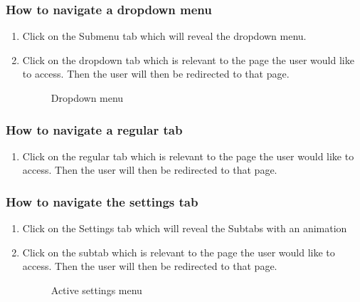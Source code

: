 \documentclass[14pt, a4paper]{article}
\begin{document}
	\subsubsection{How to navigate a dropdown menu}
		\begin{enumerate}
			\item Click on the Submenu tab which will reveal the dropdown menu.
			\item Click on the dropdown tab which is relevant to the page the user would like to access. Then the user will then be redirected to that page.
			\begin{figure}[H]
				\centerline{}
				\caption{Dropdown menu}
				\label{fig:navbar3}
			\end{figure}
		\end{enumerate}
	\subsubsection{How to navigate a regular tab}
		\begin{enumerate}
			\item Click on the regular tab which is relevant to the page the user would like to access. Then the user will then be redirected to that page.
		\end{enumerate}
	\subsubsection{How to navigate the settings tab}
		\begin{enumerate}
			\item Click on the Settings tab which will reveal the Subtabs with an animation
			\item Click on the subtab which is relevant to the page the user would like to access. Then the user will then be redirected to that page.
			\begin{figure}[H]
				\centerline{}
				\caption{Active settings menu}
				\label{fig:navbar3}
			\end{figure}
		\end{enumerate}
\end{document}

